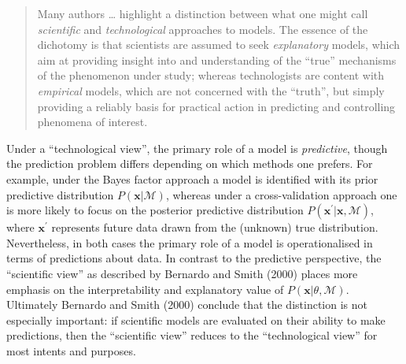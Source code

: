 \documentclass[doc]{apa6}
\theoremstyle{definition}
\theoremstyle{definition}
\theoremstyle{definition}
\theoremstyle{remark}
\begin{document}
\begin{quote}
Many authors \ldots{} highlight a distinction between what one might
call \emph{scientific} and \emph{technological} approaches to models.
The essence of the dichotomy is that scientists are assumed to seek
\emph{explanatory} models, which aim at providing insight into and
understanding of the \enquote{true} mechanisms of the phenomenon under
study; whereas technologists are content with \emph{empirical} models,
which are not concerned with the \enquote{truth}, but simply providing a
reliably basis for practical action in predicting and controlling
phenomena of interest.
\end{quote}

\noindent
Under a \enquote{technological view}, the primary role of a model is
\emph{predictive}, though the prediction problem differs depending on
which methods one prefers. For example, under the Bayes factor approach
a model is identified with its prior predictive distribution
\(P(\bm{x}|\mathcal{M})\), whereas under a cross-validation approach one
is more likely to focus on the posterior predictive distribution
\(P(\bm{x}^\prime |\bm{x}, \mathcal{M})\), where \(\bm{x}^\prime\)
represents future data drawn from the (unknown) true distribution.
Nevertheless, in both cases the primary role of a model is
operationalised in terms of predictions about data. In contrast to the
predictive perspective, the \enquote{scientific view} as described by
Bernardo and Smith (2000) places more emphasis on the interpretability
and explanatory value of \(P(\bm{x}|\theta, \mathcal{M})\). Ultimately
Bernardo and Smith (2000) conclude that the distinction is not
especially important: if scientific models are evaluated on their
ability to make predictions, then the \enquote{scientific view} reduces
to the \enquote{technological view} for most intents and purposes.
\end{document}
